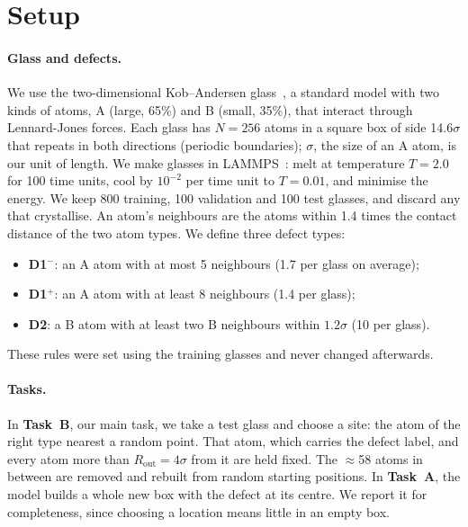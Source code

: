 \documentclass[10pt]{article}
\newcommand{\Dm}{D1$^{-}$}
\newcommand{\Dp}{D1$^{+}$}
\begin{document}
\section{Setup}
\label{sec:setup}

\paragraph{Glass and defects.} We use the two-dimensional Kob--Andersen glass~\citep{kob1995,bruning2009}, a standard model with two kinds of atoms, A (large, 65\%) and B (small, 35\%), that interact through Lennard-Jones forces. Each glass has $N=256$ atoms in a square box of side 14.6$\sigma$ that repeats in both directions (periodic boundaries); $\sigma$, the size of an A atom, is our unit of length. We make glasses in LAMMPS~\citep{thompson2022lammps}: melt at temperature $T=2.0$ for 100 time units, cool by $10^{-2}$ per time unit to $T=0.01$, and minimise the energy. We keep 800 training, 100 validation and 100 test glasses, and discard any that crystallise. An atom's neighbours are the atoms within 1.4 times the contact distance of the two atom types. We define three defect types:
\begin{itemize}
\item \textbf{\Dm}: an A atom with at most 5 neighbours (1.7 per glass on average);
\item \textbf{\Dp}: an A atom with at least 8 neighbours (1.4 per glass);
\item \textbf{D2}: a B atom with at least two B neighbours within $1.2\sigma$ (10 per glass).
\end{itemize}
These rules were set using the training glasses and never changed afterwards.

\paragraph{Tasks.} In \textbf{Task~B}, our main task, we take a test glass and choose a site: the atom of the right type nearest a random point. That atom, which carries the defect label, and every atom more than $R_\text{out}=4\sigma$ from it are held fixed. The $\approx$58 atoms in between are removed and rebuilt from random starting positions. In \textbf{Task~A}, the model builds a whole new box with the defect at its centre. We report it for completeness, since choosing a location means little in an empty box.
\end{document}
